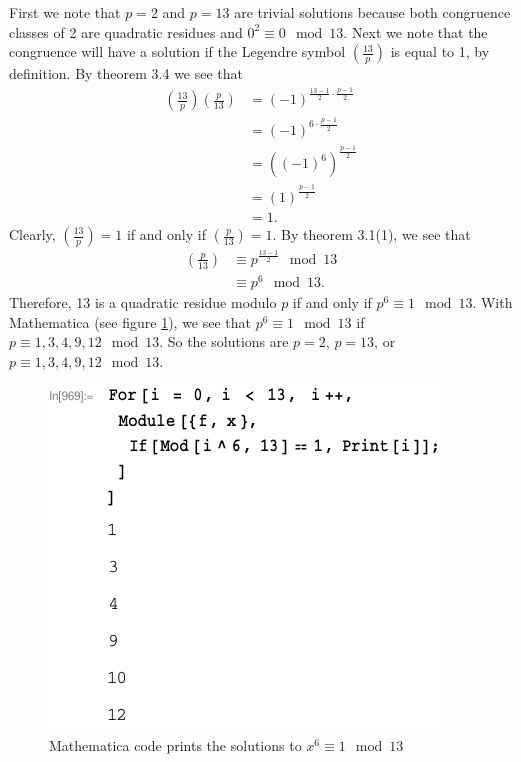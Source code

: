 \documentclass[12 pt]{amsart}
\begin{document}
  First we note that $p = 2$ and $p = 13$ are trivial 
  solutions because both congruence classes of 2 are 
  quadratic residues and $0^2 \equiv 0 \mod 13$.
  Next we note that the congruence will have a solution if the 
  Legendre symbol
  $\left( \frac{13}{p} \right)$
  is equal to 1, by definition. 
  By theorem 3.4 we see that
  \begin{align*}
    \left( \frac{13}{p} \right)
    \left( \frac{p}{13} \right)
    &=
      (-1)^{\frac{13-1}{2} \cdot \frac{p - 1}{2}} \\
    &=
      (-1)^{6 \cdot \frac{p - 1}{2}} \\
    &=
      \left((-1)^{6}\right)^{\frac{p - 1}{2}} \\
    &=
      \left(1\right)^{\frac{p - 1}{2}} \\
    &=
      1.
  \end{align*}
  Clearly, 
  $\left( \frac{13}{p} \right) = 1$
  if and only if 
  $\left( \frac{p}{13} \right) = 1$.
  By theorem 3.1(1), we see that
  \begin{align*}
    \left( \frac{p}{13} \right)
    &\equiv
      p^{\frac{13-1}{2}} \mod 13\\
    &\equiv
      p^{6} \mod 13.
  \end{align*}
  Therefore, 13 is a quadratic residue modulo $p$ if
  and only if $p^6 \equiv 1 \mod 13$.
  With Mathematica (see figure \ref{fig:1}), 
  we see that 
  $p^6 \equiv 1 \mod 13$
  if
  $p \equiv 1,3,4,9,12 \mod 13$.  
  So the solutions are $p = 2$, $p = 13$, or
  $p \equiv 1,3,4,9,12 \mod 13$.
  \begin{figure}[h]
    \includegraphics{hw5_1.pdf}
    \caption{Mathematica code prints the 
    solutions to $x^6 \equiv 1 \mod 13$}
    \label{fig:1}
  \end{figure}
\vfill
\clearpage
\newpage
\end{document}
